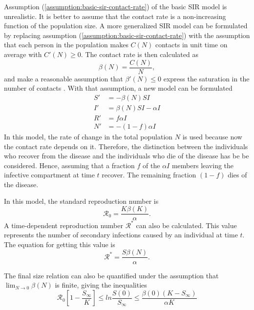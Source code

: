 Assumption (\ref{assumption:basic-sir-contact-rate}) of the basic \gls{SIR} model is unrealistic.
It is better to assume that the contact rate is a non-increasing function of the population size.
A more generalized \gls{SIR} model can be formulated by replacing assumption (\ref{assumption:basic-sir-contact-rate}) with the assumption that each person in the population makes $C(N)$ contacts in unit time on average with $C'(N) \geq 0$.
The contact rate is then calculated as
\begin{equation}
    \beta(N) = \frac{C(N)}{N},
\end{equation}
and make a reasonable assumption that $\beta'(N) \leq 0$ express the saturation in the number of contacts \cite{brauerCompartmentalModelsEpidemiology2008}.
With that assumption, a new model can be formulated
\begin{equation}
    \begin{aligned}
        S' &= - \beta(N)SI \\
        I' &= \beta(N)SI - \alpha I \\
        R' &= f \alpha I \\
        N' &= - (1 - f) \alpha I
    \end{aligned}
\end{equation}
In this model, the rate of change in the total population $N$ is used because now the contact rate depends on it.
Therefore, the distinction between the individuals who recover from the disease and the individuals who die of the disease has be be considered.
Hence, assuming that a fraction $f$ of the $\alpha I$ members leaving the infective compartment at time $t$ recover.
The remaining fraction $(1 - f)$ dies of the disease.

In this model, the standard reproduction number is \cite{brauerCompartmentalModelsEpidemiology2008}
\begin{equation}
    \mathcal{R}_0 = \frac{K\beta(K)}{\alpha}.
    \label{eq:generalized-sir-r0}
\end{equation}
A time-dependent reproduction number $\mathcal{R}^*$ can also be calculated.
This value represents the number of secondary infections caused by an individual at time $t$.
The equation for getting this value is \cite{brauerCompartmentalModelsEpidemiology2008}
\begin{equation}
    \mathcal{R}^* = \frac{S\beta(N)}{\alpha}.
\end{equation}

The final size relation can also be quantified under the assumption that $\lim_{N \to 0} \beta(N)$ is finite, giving the inequalities \cite{brauerCompartmentalModelsEpidemiology2008}
\begin{equation}
    \mathcal{R}_0 \left[ 1 - \frac{S_\infty}{K} \right] \leq ln \frac{S(0)}{S_\infty} \leq \frac{\beta(0)(K - S_\infty)}{\alpha K}
\end{equation}

